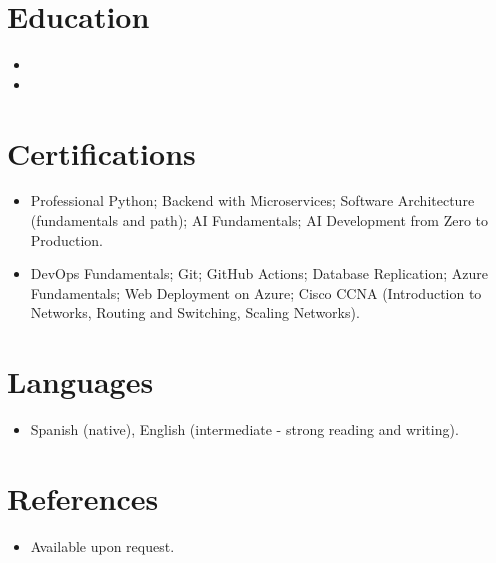\documentclass[11pt,a4paper,sans]{moderncv}
\begin{document}

\section{Education}
\vspace{1pt}
\begin{itemize}

\item{}

\vspace{3pt}

\item{}

\end{itemize}


\section{Certifications}
\vspace{1pt}
\begin{itemize}
\item {Professional Python; Backend with Microservices; Software Architecture (fundamentals and path); AI Fundamentals; AI Development from Zero to Production.}
\item {DevOps Fundamentals; Git; GitHub Actions; Database Replication; Azure Fundamentals; Web Deployment on Azure; Cisco CCNA (Introduction to Networks, Routing and Switching, Scaling Networks).}
\end{itemize}


\section{Languages}
\vspace{1pt}
\begin{itemize}
\item {Spanish (native), English (intermediate - strong reading and writing).}
\end{itemize}


\section{References}
\vspace{1pt}
\begin{itemize}
\item{Available upon request.}
\end{itemize}
\end{document}
